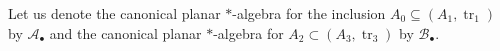 \documentclass[11pt]{article}
\theoremstyle{plain}
\newtheorem{cor}[thm]{Corollary}
\theoremstyle{definition}
\DeclareMathOperator{\tr}{tr}
\newcommand{\set}[2]{\left\{#1 \middle| #2\right\}}
\newcommand{\nn}[1]{\textcolor{red}{[[#1]]}}
\newcommand{\roundNbox}[6]{
	\draw[rounded corners=5pt, very thick, #1] ($#2+(-#3,-#3)+(-#4,0)$) rectangle ($#2+(#3,#3)+(#5,0)$);
	\coordinate (ZZa) at ($#2+(-#4,0)$);
	\coordinate (ZZb) at ($#2+(#5,0)$);
	\node at ($1/2*(ZZa)+1/2*(ZZb)$) {#6};
}
\begin{document}
%
%
%

Let us denote the canonical planar $\ast$-algebra for the inclusion $A_0 \subseteq (A_1,\tr_1)$ by $\mathcal{A}_{\bullet}$ and the canonical planar $\ast$-algebra for $A_2 \subset (A_3,\tr_3)$ by $\mathcal{B}_{\bullet}$.
\end{document}

